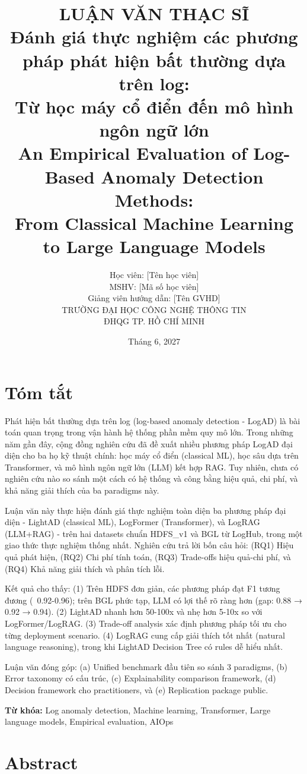 \documentclass[12pt,a4paper,oneside]{report}
\title{
    \textbf{LUẬN VĂN THẠC SĨ} \\[1cm]
    \Large Đánh giá thực nghiệm các phương pháp phát hiện bất thường dựa trên log: \\
    Từ học máy cổ điển đến mô hình ngôn ngữ lớn \\[1cm]
    \large An Empirical Evaluation of Log-Based Anomaly Detection Methods: \\
    From Classical Machine Learning to Large Language Models
}
\author{Học viên: [Tên học viên] \\
        MSHV: [Mã số học viên] \\[1cm]
        Giảng viên hướng dẫn: [Tên GVHD] \\[2cm]
        TRƯỜNG ĐẠI HỌC CÔNG NGHỆ THÔNG TIN \\
        ĐHQG TP. HỒ CHÍ MINH}
\date{Tháng 6, 2027}
\begin{document}
\maketitle
\thispagestyle{empty}

\newpage
\chapter*{Tóm tắt}

Phát hiện bất thường dựa trên log (log-based anomaly detection - LogAD) là bài toán quan trọng trong vận hành hệ thống phần mềm quy mô lớn. Trong những năm gần đây, cộng đồng nghiên cứu đã đề xuất nhiều phương pháp LogAD đại diện cho ba họ kỹ thuật chính: học máy cổ điển (classical ML), học sâu dựa trên Transformer, và mô hình ngôn ngữ lớn (LLM) kết hợp RAG. Tuy nhiên, chưa có nghiên cứu nào so sánh một cách có hệ thống và công bằng hiệu quả, chi phí, và khả năng giải thích của ba paradigms này.

Luận văn này thực hiện đánh giá thực nghiệm toàn diện ba phương pháp đại diện - LightAD (classical ML), LogFormer (Transformer), và LogRAG (LLM+RAG) - trên hai datasets chuẩn HDFS\_v1 và BGL từ LogHub, trong một giao thức thực nghiệm thống nhất. Nghiên cứu trả lời bốn câu hỏi: (RQ1) Hiệu quả phát hiện, (RQ2) Chi phí tính toán, (RQ3) Trade-offs hiệu quả-chi phí, và (RQ4) Khả năng giải thích và phân tích lỗi.

Kết quả cho thấy: (1) Trên HDFS đơn giản, các phương pháp đạt F1 tương đương (~0.92-0.96); trên BGL phức tạp, LLM có lợi thế rõ ràng hơn (gap: 0.88 → 0.92 → 0.94). (2) LightAD nhanh hơn 50-100x và nhẹ hơn 5-10x so với LogFormer/LogRAG. (3) Trade-off analysis xác định phương pháp tối ưu cho từng deployment scenario. (4) LogRAG cung cấp giải thích tốt nhất (natural language reasoning), trong khi LightAD Decision Tree có rules dễ hiểu nhất.

Luận văn đóng góp: (a) Unified benchmark đầu tiên so sánh 3 paradigms, (b) Error taxonomy có cấu trúc, (c) Explainability comparison framework, (d) Decision framework cho practitioners, và (e) Replication package public.

\textbf{Từ khóa:} Log anomaly detection, Machine learning, Transformer, Large language models, Empirical evaluation, AIOps

\newpage
\chapter*{Abstract}
\end{document}
